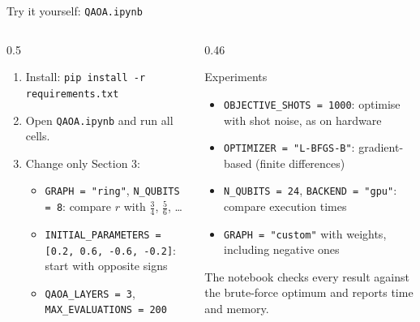 \documentclass[aspectratio=169,11pt]{beamer}
\begin{document}
\begin{frame}{Try it yourself: \texttt{QAOA.ipynb}}
  \begin{columns}[T]
    \begin{column}{0.5\textwidth}
      \begin{enumerate}
        \item Install: \texttt{pip install -r requirements.txt}
        \item Open \texttt{QAOA.ipynb} and run all cells.
        \item Change only Section 3:
          \begin{itemize}
            \item \texttt{GRAPH = "ring"}, \texttt{N\_QUBITS = 8}: compare $r$ with $\frac34$, $\frac56$, \dots
            \item \texttt{INITIAL\_PARAMETERS = [0.2, 0.6, -0.6, -0.2]}: start with opposite signs
            \item \texttt{QAOA\_LAYERS = 3}, \texttt{MAX\_EVALUATIONS = 200}
          \end{itemize}
      \end{enumerate}
    \end{column}
    \begin{column}{0.46\textwidth}
      \begin{block}{Experiments}
        \begin{itemize}
          \item \texttt{OBJECTIVE\_SHOTS = 1000}: optimise with shot noise, as on hardware
          \item \texttt{OPTIMIZER = "L-BFGS-B"}: gradient-based (finite differences)
          \item \texttt{N\_QUBITS = 24}, \texttt{BACKEND = "gpu"}: compare execution times
          \item \texttt{GRAPH = "custom"} with weights, including negative ones
        \end{itemize}
      \end{block}
      \small The notebook checks every result against the brute-force optimum and reports time and memory.
    \end{column}
  \end{columns}
\end{frame}

\end{document}
